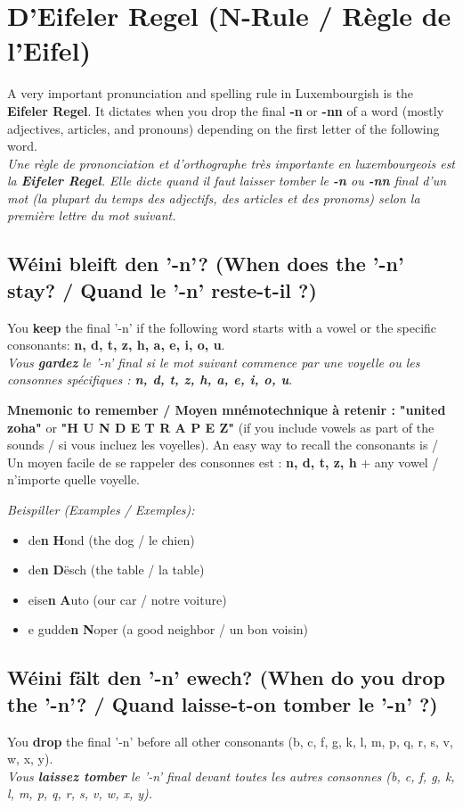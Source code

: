\section{D'Eifeler Regel (N-Rule / Règle de l'Eifel)}

A very important pronunciation and spelling rule in Luxembourgish is the \textbf{Eifeler Regel}. It dictates when you drop the final \textbf{-n} or \textbf{-nn} of a word (mostly adjectives, articles, and pronouns) depending on the first letter of the following word. \\
\textit{Une règle de prononciation et d'orthographe très importante en luxembourgeois est la \textbf{Eifeler Regel}. Elle dicte quand il faut laisser tomber le \textbf{-n} ou \textbf{-nn} final d'un mot (la plupart du temps des adjectifs, des articles et des pronoms) selon la première lettre du mot suivant.}

\subsection*{Wéini bleift den '-n'? (When does the '-n' stay? / Quand le '-n' reste-t-il ?)}
You \textbf{keep} the final '-n' if the following word starts with a vowel or the specific consonants: \textbf{n, d, t, z, h, a, e, i, o, u}. \\
\textit{Vous \textbf{gardez} le '-n' final si le mot suivant commence par une voyelle ou les consonnes spécifiques : \textbf{n, d, t, z, h, a, e, i, o, u}.}

\textbf{Mnemonic to remember / Moyen mnémotechnique à retenir :} \textbf{"united zoha"} or \textbf{"H U N D E T R A P E Z"} (if you include vowels as part of the sounds / si vous incluez les voyelles). An easy way to recall the consonants is / Un moyen facile de se rappeler des consonnes est : \textbf{n, d, t, z, h} + any vowel / n'importe quelle voyelle.

\textit{Beispiller (Examples / Exemples):}
\begin{itemize}
    \item de\textbf{n} \textbf{H}ond (the dog / le chien)
    \item de\textbf{n} \textbf{D}ësch (the table / la table)
    \item eise\textbf{n} \textbf{A}uto (our car / notre voiture)
    \item e gudde\textbf{n} \textbf{N}oper (a good neighbor / un bon voisin)
\end{itemize}

\subsection*{Wéini fält den '-n' ewech? (When do you drop the '-n'? / Quand laisse-t-on tomber le '-n' ?)}
You \textbf{drop} the final '-n' before all other consonants (b, c, f, g, k, l, m, p, q, r, s, v, w, x, y). \\
\textit{Vous \textbf{laissez tomber} le '-n' final devant toutes les autres consonnes (b, c, f, g, k, l, m, p, q, r, s, v, w, x, y).}

